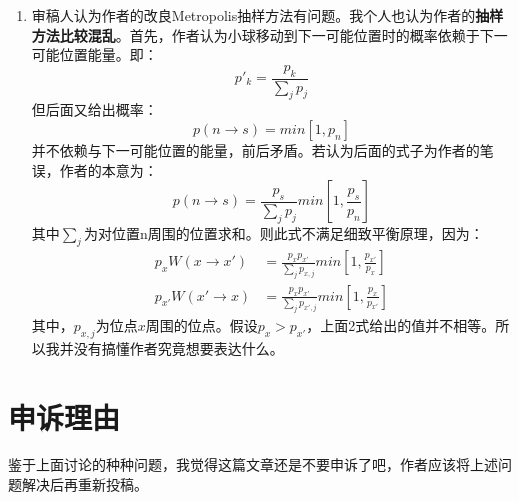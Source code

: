 \documentclass[a4paper,11pt]{article}
\begin{document}
\begin{enumerate}
\item  审稿人认为作者的改良Metropolis抽样方法有问题。我个人也认为作者的\textbf{抽样方法比较混乱}。首先，作者认为小球移动到下一可能位置时的概率依赖于下一可能位置能量。即：
\begin{equation}
	p'_{k} =  \frac{p_{k}}{\sum_{j}p_{j}}
\end{equation}
但后面又给出概率：
\begin{equation}
	p(n\rightarrow s ) = min[1,p_{n}]
\end{equation}
并不依赖与下一可能位置的能量，前后矛盾。若认为后面的式子为作者的笔误，作者的本意为：
\begin{equation}
	p(n\rightarrow s ) = \frac{p_{s}}{\sum_{j}p_{j}}  min[1,\frac{p_{s}}{p_{n}}]
\end{equation}
其中$\sum_{j}$为对位置n周围的位置求和。则此式不满足细致平衡原理，因为：
\begin{equation}
\begin{aligned}
	p_{x}W( x\rightarrow x' ) &=  \frac{p_{x}p_{x'}}{\sum_{j}p_{x,j}}  min[1,\frac{p_{x'}}{p_{x}}] \\ 
	p_{x'}W( x'\rightarrow x ) &=  \frac{p_{x}p_{x'}}{\sum_{j}p_{x',j}}  min[1,\frac{p_{x}}{p_{x'}}]
\end{aligned}
\end{equation}
其中，$p_{x,j}$为位点$x$周围的位点。假设$p_{x} > p_{x'}$，上面2式给出的值并不相等。所以我并没有搞懂作者究竟想要表达什么。


\end{enumerate}

\section{申诉理由}
鉴于上面讨论的种种问题，我觉得这篇文章还是不要申诉了吧，作者应该将上述问题解决后再重新投稿。
\end{document}
